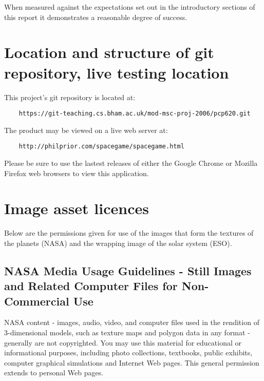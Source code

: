 \documentclass[twoside]{bhamthesis}
\begin{document}
When measured against the expectations set out in the introductory sections of this report it demonstrates a reasonable degree of success.



\printbibliography

\appendix
\appendixpage
\addappheadtotoc

\section{Location and structure of git repository, live testing location}

This project's git repository is located at:
\begin{verbatim}
	https://git-teaching.cs.bham.ac.uk/mod-msc-proj-2006/pcp620.git
\end{verbatim}




\noindent
The product may be viewed on a live web server at:
\begin{verbatim}
	http://philprior.com/spacegame/spacegame.html
\end{verbatim}
Please be sure to use the lastest releases of either the Google Chrome or Mozilla Firefox web browsers to view this application.

\newpage

\section{Image asset licences}

Below are the permissions given for use of the images that form the textures of the planets (NASA) and the wrapping image of the solar system (ESO).

\subsection{NASA Media Usage Guidelines - Still Images and Related Computer Files for Non-Commercial Use}

NASA content - images, audio, video, and computer files used in the rendition of 3-dimensional models, such as texture maps and polygon data in any format - generally are not copyrighted. You may use this material for educational or informational purposes, including photo collections, textbooks, public exhibits, computer graphical simulations and Internet Web pages. This general permission extends to personal Web pages.
\end{document}
